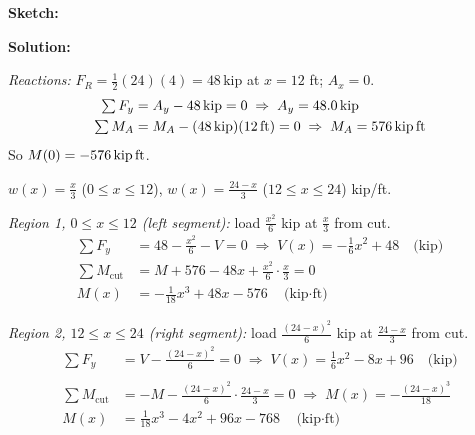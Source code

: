 \documentclass[11pt]{article}
\newcommand{\un}[1]{\,\text{#1}}
\newcommand{\axesglyph}[1]{%
  \draw[axis] #1 -- ++(0.7,0) node[right]{\small $x$};
  \draw[axis] #1 -- ++(0,0.7) node[above]{\small $y$};
}
\begin{document}
\textbf{Sketch:}

\begin{center}
\end{center}

\textbf{Solution:}

\textit{Reactions:} $F_R = \tfrac12(24)(4) = 48\un{kip}$ at $x = 12$ ft; $A_x = 0$.
\begin{align*}
\textstyle\sum F_y &= A_y - 48\un{kip} = 0 \;\Rightarrow\; A_y = 48.0\un{kip}\\
\textstyle\sum M_A &= M_A - (48\un{kip})(12\un{ft}) = 0 \;\Rightarrow\; M_A = 576\un{kip\,ft}
\end{align*}
So $M(0) = -576\un{kip\,ft}$.

$w(x) = \tfrac{x}{3}$ ($0 \le x \le 12$), \quad $w(x) = \tfrac{24-x}{3}$ ($12 \le x \le 24$) kip/ft.

\textit{Region 1, $0 \le x \le 12$ (left segment):} load $\tfrac{x^2}{6}$ kip at $\tfrac{x}{3}$ from cut.
\begin{align*}
\textstyle\sum F_y &= 48 - \frac{x^2}{6} - V = 0 \;\Rightarrow\; V(x) = -\frac{1}{6}x^2 + 48 \quad \text{(kip)}\\
\textstyle\sum M_{\text{cut}} &= M + 576 - 48x + \frac{x^2}{6}\cdot\frac{x}{3} = 0\\ M(x) &= -\frac{1}{18}x^3 + 48x - 576 \quad \text{(kip$\cdot$ft)}
\end{align*}

\textit{Region 2, $12 \le x \le 24$ (right segment):} load $\tfrac{(24-x)^2}{6}$ kip at $\tfrac{24-x}{3}$ from cut.
\begin{align*}
\textstyle\sum F_y &= V - \frac{(24-x)^2}{6} = 0 \;\Rightarrow\; V(x) = \frac{1}{6}x^2 - 8x + 96 \quad \text{(kip)}\\\\
\textstyle\sum M_{\text{cut}} &= -M - \frac{(24-x)^2}{6}\cdot\frac{24-x}{3} = 0 \;\Rightarrow\; M(x) = -\frac{(24-x)^3}{18}\\
M(x) &= \frac{1}{18}x^3 - 4x^2 + 96x - 768 \quad \text{(kip$\cdot$ft)}
\end{align*}
\end{document}
